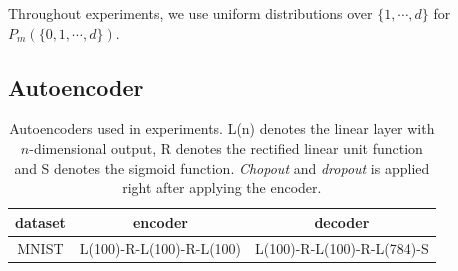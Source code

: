 \documentclass{article}
\begin{document}
    Throughout experiments, we use uniform distributions over $\{1, \cdots, d\}$ for $P_m(\{0, 1, \cdots, d\})$.

    \subsection{Autoencoder}

    \begin{table}[h]
        \caption{Autoencoders used in experiments. L(n) denotes the linear layer with $n$-dimensional output, R denotes the rectified linear unit function and S denotes the sigmoid function. \textit{Chopout} and \textit{dropout} is applied right after applying the encoder.}    
        \centering
        \begin{tabular}{c|c|c}
            dataset & encoder & decoder \\ \hline \hline
            MNIST & L(100)-R-L(100)-R-L(100) & L(100)-R-L(100)-R-L(784)-S
        \end{tabular}
        \label{tab:mnist_ae}
    \end{table}
    
\end{document}
